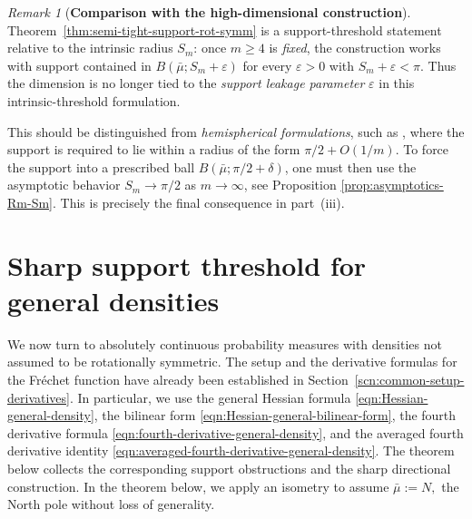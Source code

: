 \documentclass{amsart}
\theoremstyle{definition}
\theoremstyle{remark}
\newtheorem{remark}[theorem]{Remark}
\newcommand{\mubar}{\bar{\mu}}
\newcommand\0{\boldsymbol{0}}
\begin{document}
\begin{remark}[\textbf{Comparison with the high-dimensional construction}]
Theorem~\ref{thm:semi-tight-support-rot-symm} is a support-threshold statement relative to the intrinsic radius \(S_m\): once \(m\ge4\) is \textit{fixed}, the construction works with support contained in \(B(\mubar;S_m+\varepsilon)\) for every \(\varepsilon>0\) with \(S_m+\varepsilon<\pi\). Thus the dimension is no longer tied to the\textit{ support leakage parameter} \(\varepsilon\) in this intrinsic-threshold formulation.

This should be distinguished from \textit{hemispherical formulations}, such as \citet[Theorem~3.3(i)]{Eltzner2022GeometricalSmeariness}, where the support is required to lie within a radius of the form \(\pi/2+O(1/m)\). To force the support into a prescribed ball \(B(\mubar;\pi/2+\delta)\), one must then use the asymptotic behavior \(S_m \to\pi/2\) as \(m\to\infty\), see Proposition \ref{prop:asymptotics-Rm-Sm}. This is precisely the final consequence in part~(iii).
\end{remark}

\section{Sharp support threshold for general densities}
\label{scn:general-density-support-threshold}

We now turn to absolutely continuous probability measures with densities not assumed to be rotationally symmetric. The setup and the derivative formulas for the Fréchet function have already been established in Section~\ref{scn:common-setup-derivatives}. In particular, we use the general Hessian formula \eqref{eqn:Hessian-general-density}, the bilinear form \eqref{eqn:Hessian-general-bilinear-form}, the fourth derivative formula \eqref{eqn:fourth-derivative-general-density}, and the averaged fourth derivative identity \eqref{eqn:averaged-fourth-derivative-general-density}. The theorem below collects the corresponding support obstructions and the sharp directional construction. In the theorem below, we apply an isometry to assume $\mubar:=N,$ the North pole without loss of generality.
\end{document}
